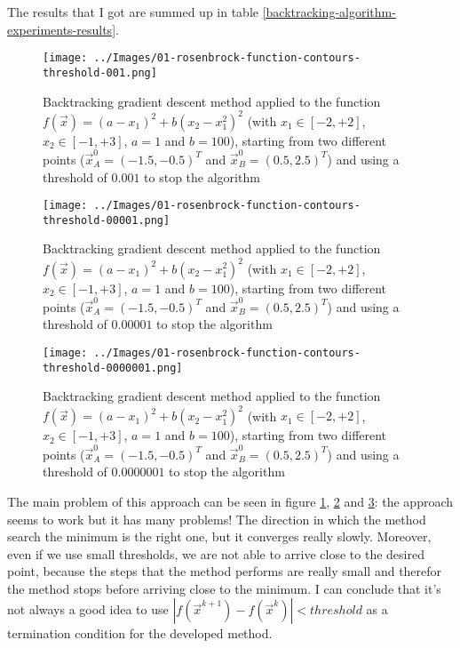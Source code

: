         The results that I got are summed up in table \ref{backtracking-algorithm-experiments-results}.
        \begin{figure}
            \centering
            \texttt{[image: ../Images/01-rosenbrock-function-contours-threshold-001.png]}
            \caption{Backtracking gradient descent method applied to the function \(f(\vec{x}) = (a - x_1)^2 + b(x_2 - x_1^2)^2\) (with \(x_1 \in [-2, +2]\), \(x_2 \in [-1, +3]\), \(a=1\) and \(b=100\)), starting from two different points (\(\vec{x}_A^0 = (-1.5,-0.5)^T\) and \(\vec{x}_B^0 = (0.5, 2.5)^T\)) and using a threshold of \(0.001\) to stop the algorithm}
            \label{rosenbrock-function-contours-threshold-001}
        \end{figure}
        \begin{figure}
            \centering
            \texttt{[image: ../Images/01-rosenbrock-function-contours-threshold-00001.png]}
            \caption{Backtracking gradient descent method applied to the function \(f(\vec{x}) = (a - x_1)^2 + b(x_2 - x_1^2)^2\) (with \(x_1 \in [-2, +2]\), \(x_2 \in [-1, +3]\), \(a=1\) and \(b=100\)), starting from two different points (\(\vec{x}_A^0 = (-1.5,-0.5)^T\) and \(\vec{x}_B^0 = (0.5, 2.5)^T\)) and using a threshold of \(0.00001\) to stop the algorithm}
            \label{rosenbrock-function-contours-threshold-00001}
        \end{figure}
        \begin{figure}
            \centering
            \texttt{[image: ../Images/01-rosenbrock-function-contours-threshold-0000001.png]}
            \caption{Backtracking gradient descent method applied to the function \(f(\vec{x}) = (a - x_1)^2 + b(x_2 - x_1^2)^2\) (with \(x_1 \in [-2, +2]\), \(x_2 \in [-1, +3]\), \(a=1\) and \(b=100\)), starting from two different points (\(\vec{x}_A^0 = (-1.5,-0.5)^T\) and \(\vec{x}_B^0 = (0.5, 2.5)^T\)) and using a threshold of \(0.0000001\) to stop the algorithm}
            \label{rosenbrock-function-contours-threshold-0000001}
        \end{figure}
        The main problem of this approach can be seen in figure \ref{rosenbrock-function-contours-threshold-001}, \ref{rosenbrock-function-contours-threshold-00001} and \ref{rosenbrock-function-contours-threshold-0000001}: the approach seems to work but it has many problems! The direction in which the method search the minimum is the right one, but it converges really slowly. Moreover, even if we use small thresholds, we are not able to arrive close to the desired point, because the steps that the method performs are really small and therefor the method stops before arriving close to the minimum. I can conclude that it's not always a good idea to use \(|f(\vec{x}^{k+1}) - f(\vec{x}^k)| < threshold\) as a termination condition for the developed method.
